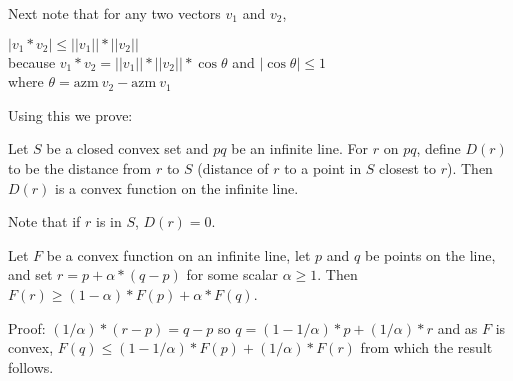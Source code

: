 \documentclass[12pt]{article}
\begin{document}
Next note that for any two vectors $v_1$ and $v_2$,
\begin{center}
$|v_1*v_2|\le||v_1||*||v_2||$ \\
because $v_1*v_2 = ||v_1||*||v_2||*\cos\theta$ and $|\cos\theta|\le 1$ \\
where $\theta = \mathrm{azm}~v_2 - \mathrm{azm}~v_1$
\end{center}

Using this we prove:

\begin{lemma}
Let $S$ be a closed convex set and $pq$ be an infinite line.  For $r$ on $pq$,
define $D(r)$ to be the distance from $r$ to $S$ (distance of
$r$ to a point in $S$ closest to $r$).  Then $D(r)$ is a convex
function on the infinite line.
\end{lemma}

Note that if $r$ is in $S$, $D(r) = 0$.

\begin{lemma}
Let $F$ be a convex function on an infinite line,
let $p$ and $q$ be points on the line, and set $r=p+\alpha*(q-p)$
for some scalar $\alpha\ge 1$.  Then $F(r)\ge(1-\alpha)*F(p)+\alpha*F(q)$.
\end{lemma}
\begin{indpar}{0.2in}
Proof: $(1/\alpha)*(r-p) = q-p$ so $q = (1 - 1/\alpha)*p + (1/\alpha)*r$
and as $F$ is convex,
$F(q)\le(1-1/\alpha)*F(p)+(1/\alpha)*F(r)$ from which the result
follows.
\end{indpar}
\end{document}
